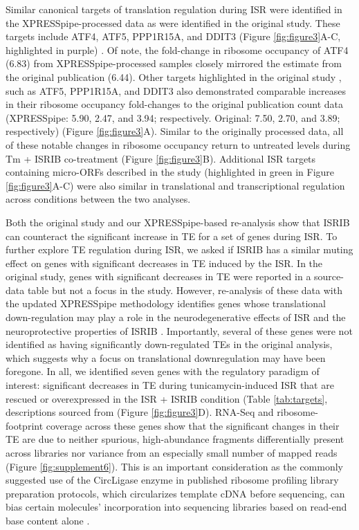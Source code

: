 \documentclass[10pt, oneside]{article}
\begin{document}
Similar canonical targets of translation regulation during ISR were identified in the XPRESSpipe-processed data as were identified in the original study. These targets include ATF4, ATF5, PPP1R15A, and DDIT3 (Figure \ref{fig:figure3}A-C, highlighted in purple) \cite{isrib_riboseq}. Of note, the fold-change in ribosome occupancy of ATF4 (6.83) from XPRESSpipe-processed samples closely mirrored the estimate from the original publication (6.44). Other targets highlighted in the original study \cite{isrib_riboseq}, such as ATF5, PPP1R15A, and DDIT3 also demonstrated comparable increases in their ribosome occupancy fold-changes to the original publication count data (XPRESSpipe: 5.90, 2.47, and 3.94; respectively. Original: 7.50, 2.70, and 3.89; respectively) (Figure \ref{fig:figure3}A). Similar to the originally processed data, all of these notable changes in ribosome occupancy return to untreated levels during Tm + ISRIB co-treatment (Figure \ref{fig:figure3}B). Additional ISR targets containing micro-ORFs described in the study (highlighted in green in Figure \ref{fig:figure3}A-C) were also similar in translational and transcriptional regulation across conditions between the two analyses. \par

Both the original study and our XPRESSpipe-based re-analysis show that ISRIB can counteract the significant increase in TE for a set of genes during ISR. To further explore TE regulation during ISR, we asked if ISRIB has a similar muting effect on genes with significant decreases in TE induced by the ISR. In the original study, genes with significant decreases in TE were reported in a source-data table but not a focus in the study. However, re-analysis of these data with the updated XPRESSpipe methodology identifies genes whose translational down-regulation may play a role in the neurodegenerative effects of ISR and the neuroprotective properties of ISRIB \cite{isrib_neuroprotective,isrib_neuroprotective2,isrib_neuroprotective3,isrib_neuroprotective4}. Importantly, several of these genes were not identified as having significantly down-regulated TEs in the original analysis, which suggests why a focus on translational downregulation may have been foregone. In all, we identified seven genes with the regulatory paradigm of interest: significant decreases in TE during tunicamycin-induced ISR that are rescued or overexpressed in the ISR + ISRIB condition (Table \ref{tab:targets}, descriptions sourced from \cite{genecards, ncbi, uniprot} (Figure \ref{fig:figure3}D). RNA-Seq and ribosome-footprint coverage across these genes show that the significant changes in their TE are due to neither spurious, high-abundance fragments differentially present across libraries nor variance from an especially small number of mapped reads (Figure \ref{fig:supplement6}). This is an important consideration as the commonly suggested use of the CircLigase enzyme in published ribosome profiling library preparation protocols, which circularizes template cDNA before sequencing, can bias certain molecules' incorporation into sequencing libraries based on read-end base content alone \cite{circligase_bias}. \par
\end{document}
